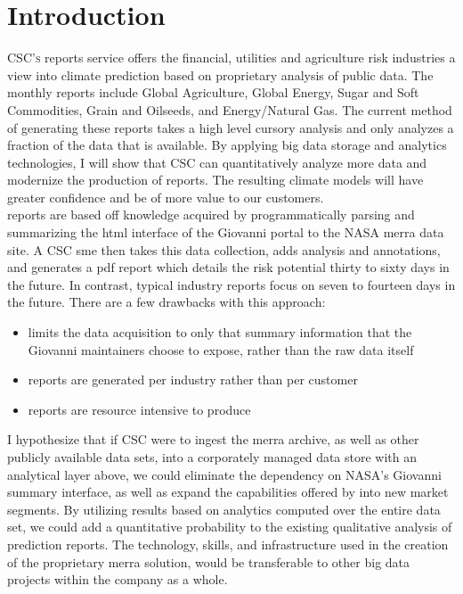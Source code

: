
\chapter{Introduction}
\textsc{CSC's} \climatedge reports service offers the financial, utilities and agriculture risk industries a view into climate prediction based on proprietary analysis of public data. The monthly reports include Global Agriculture, Global Energy, Sugar and Soft Commodities, Grain and Oilseeds, and Energy/Natural Gas\cite{climatedgeurl}. The current method of generating these reports takes a high level cursory analysis and only analyzes a fraction of the data that is available. By applying big data  storage and analytics technologies, I will show that \textsc{CSC} can quantitatively analyze more data and modernize the production of \climatedge reports. The resulting climate models will have greater confidence and be of more value to our customers.\\

\climatedge reports are based off knowledge acquired by programmatically parsing and summarizing the \gls{html} interface of the Giovanni\cite{giovanni} portal to the NASA \gls{merra} data site.  A \textsc{CSC} \gls{sme} then takes this data collection, adds analysis and annotations, and generates a \gls{pdf} report which details the risk potential thirty to sixty days in the future. In contrast, typical industry reports focus on seven to fourteen days in the future. There are a few drawbacks with this approach:
\begin{itemize}
    \item{limits the data acquisition to only that summary information that the Giovanni  maintainers choose to expose, rather than the raw data itself}
    \item{reports are generated per industry rather than per customer}
    \item{reports are resource intensive to produce}
\end{itemize}
I hypothesize that if \textsc{CSC} were to ingest the \gls{merra} archive, as well as other publicly available data sets, into a corporately managed data store with an analytical layer above, we could eliminate the dependency on NASA's Giovanni summary interface, as well as expand the capabilities offered by \climatedge into new market segments. By utilizing results based on analytics computed over the entire data set, we could add a quantitative probability to the existing qualitative analysis of \climatedge prediction reports. The technology, skills, and infrastructure used in the creation of the proprietary \gls{merra} solution, would be transferable to other big data projects within the company as a whole.\\

